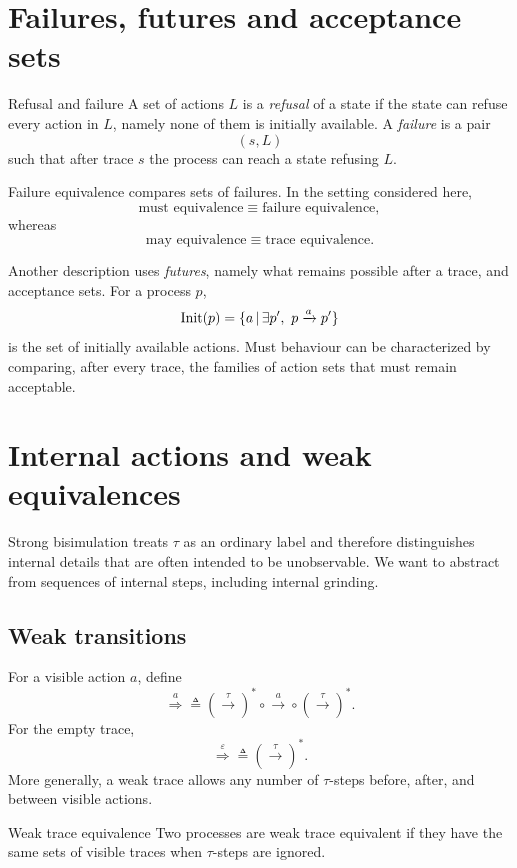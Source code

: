 \documentclass[a4paper]{article}
\newcommand{\Init}{\operatorname{Init}}
\newcommand{\eps}{\varepsilon}
\newcommand{\trans}[1]{\xrightarrow{#1}}
\newcommand{\wtrans}[1]{\mathrel{\overset{#1}{\Rightarrow}}}
\begin{document}
\section{Failures, futures and acceptance sets}

\begin{snippetdefinition}{Refusal and failure}
    A set of actions \(L\) is a \emph{refusal} of a state if the state can refuse every action in \(L\), namely none of them is initially available.
    A \emph{failure} is a pair
    \[
        (s,L)
    \]
    such that after trace \(s\) the process can reach a state refusing \(L\).
\end{snippetdefinition}

Failure equivalence compares sets of failures.
In the setting considered here,
\[
    \text{must equivalence}
    \equiv
    \text{failure equivalence},
\]
whereas
\[
    \text{may equivalence}
    \equiv
    \text{trace equivalence}.
\]

Another description uses \emph{futures}, namely what remains possible after a trace, and acceptance sets.
For a process \(p\),
\[
    \Init(p)=\{a\suchthat\exists p',\ p\trans{a}p'\}
\]
is the set of initially available actions.
Must behaviour can be characterized by comparing, after every trace, the families of action sets that must remain acceptable.

\section{Internal actions and weak equivalences}

Strong bisimulation treats \(\tau\) as an ordinary label and therefore distinguishes internal details that are often intended to be unobservable.
We want to abstract from sequences of internal steps, including internal grinding.

\subsection{Weak transitions}

For a visible action \(a\), define
\[
    \wtrans{a}
    \triangleq
    (\trans{\tau})^*
    \circ
    \trans{a}
    \circ
    (\trans{\tau})^*.
\]
For the empty trace,
\[
    \wtrans{\eps}
    \triangleq
    (\trans{\tau})^*.
\]
More generally, a weak trace allows any number of \(\tau\)-steps before, after, and between visible actions.

\begin{snippetdefinition}{Weak trace equivalence}
    Two processes are weak trace equivalent if they have the same sets of visible traces when \(\tau\)-steps are ignored.
\end{snippetdefinition}
\end{document}
